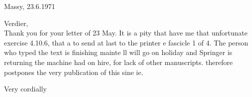 \begin{flushright}
Massy, 23.6.1971\\
\end{flushright}
 Verdier,\\

Thank you for your letter of 23 May. It is a pity that  have   me that unfortunate exercise 4.10.6, that a  to send at last to the printer e fascicle 1 of  4. The person who typed the text is finishing mainte ll will go on holiday and Springer is returning the machine  had on hire, for lack of other manuscripts.  therefore postpones the very publication of this  sine ie.

Very cordially\\
